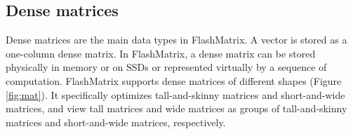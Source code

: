 

\subsection{Dense matrices}
Dense matrices are the main data types in FlashMatrix. A vector is stored
as a one-column dense matrix. In FlashMatrix, a dense matrix can be stored
physically in memory or on SSDs or represented virtually by a sequence of
computation. FlashMatrix supports dense matrices of different shapes
(Figure \ref{fig:mat}). It specifically optimizes tall-and-skinny matrices
and short-and-wide matrices, and view tall matrices and wide matrices
as groups of tall-and-skinny matrices and short-and-wide matrices, respectively.

